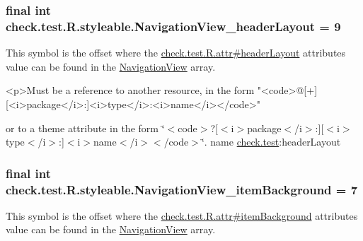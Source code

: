 \subsubsection[{Navigation\+View\+\_\+header\+Layout}]{\setlength{\rightskip}{0pt plus 5cm}final int check.\+test.\+R.\+styleable.\+Navigation\+View\+\_\+header\+Layout = 9\hspace{0.3cm}{\ttfamily [static]}}\label{classcheck_1_1test_1_1_r_1_1styleable_ab9421b2c3084fab03258249932b7e0fd}
This symbol is the offset where the \hyperlink{classcheck_1_1test_1_1_r_1_1attr_aa746f0c87830e1191999d068e48d164b}{check.\+test.\+R.\+attr\#header\+Layout} attribute\textquotesingle{}s value can be found in the \hyperlink{classcheck_1_1test_1_1_r_1_1styleable_a70ac59d722f1e4aac4b206dcf5f53107}{Navigation\+View} array.

\begin{DoxyVerb}      <p>Must be a reference to another resource, in the form "<code>@[+][<i>package</i>:]<i>type</i>:<i>name</i></code>"
\end{DoxyVerb}
 or to a theme attribute in the form \char`\"{}$<$code$>$?\mbox{[}$<$i$>$package$<$/i$>$\+:\mbox{]}\mbox{[}$<$i$>$type$<$/i$>$\+:\mbox{]}$<$i$>$name$<$/i$>$$<$/code$>$\char`\"{}.  name \hyperlink{namespacecheck_1_1test}{check.\+test}\+:header\+Layout \hypertarget{classcheck_1_1test_1_1_r_1_1styleable_a6f64b2a76b94c56288e3b8818af36228}{}
\subsubsection[{Navigation\+View\+\_\+item\+Background}]{\setlength{\rightskip}{0pt plus 5cm}final int check.\+test.\+R.\+styleable.\+Navigation\+View\+\_\+item\+Background = 7\hspace{0.3cm}{\ttfamily [static]}}\label{classcheck_1_1test_1_1_r_1_1styleable_a6f64b2a76b94c56288e3b8818af36228}
This symbol is the offset where the \hyperlink{classcheck_1_1test_1_1_r_1_1attr_a11b086908d75b84fb5b23568084c00d8}{check.\+test.\+R.\+attr\#item\+Background} attribute\textquotesingle{}s value can be found in the \hyperlink{classcheck_1_1test_1_1_r_1_1styleable_a70ac59d722f1e4aac4b206dcf5f53107}{Navigation\+View} array.


